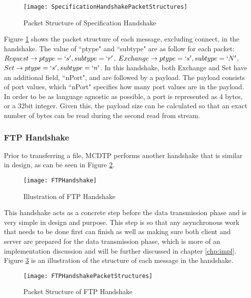 \begin{figure}[ht]
\centering
\texttt{[image: SpecificationHandshakePacketStructures]}
\caption{Packet Structure of Specification Handshake}
\label{fig:specs-struct}
\end{figure}

Figure \ref{fig:specs-struct} shows the packet structure of each message, excluding connect, in the handshake. The value of ``ptype" and ``subtype" are as follow for each packet: $Request \rightarrow ptype = \lq{s}\rq,subtype = \lq{r}\rq$, $Exchange \rightarrow ptype = \lq{s}\rq,subtype = \lq{N}\rq$, $Set \rightarrow ptype = \lq{s}\rq,subtype = \lq{n}\rq$. In this handshake, both Exchange and Set have an additional field, ``nPort", and are followed by a payload. The payload consists of port values, which ``nPort" specifies how many port values are in the payload. In order to be as language agnostic as possible, a port is represented as 4 bytes, or a 32bit integer. Given this, the payload size can be calculated so that an exact number of bytes can be read during the second read from stream.

\subsubsection{FTP Handshake}\label{subsec:ftp-hs}

Prior to transferring a file, MCDTP performs another handshake that is similar in design, as can be seen in Figure \ref{fig:ftp-hs}.

\begin{figure}[ht]
\centering
\texttt{[image: FTPHandshake]}
\caption{Illustration of FTP Handshake}
\label{fig:ftp-hs}
\end{figure}

This handshake acts as a concrete step before the data transmission phase and is very simple in design and purpose. This step is so that any asynchronous work that needs to be done first can finish as well as making sure both client and server are prepared for the data transmission phase, which is more of an implementation discussion and will be further discussed in chapter \ref{chp:impl}. Figure \ref{fig:ftp-struct} is an illustration of the structure of each message in the handshake.

\begin{figure}[ht]
\centering
\texttt{[image: FTPHandshakePacketStructures]}
\caption{Packet Structure of FTP Handshake}
\label{fig:ftp-struct}
\end{figure}

